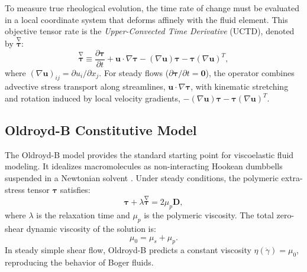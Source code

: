 To measure true rheological evolution, the time rate of change must be evaluated in a local coordinate system that deforms affinely with the fluid element.
This objective tensor rate is the \textit{Upper-Convected Time Derivative} (UCTD), denoted by $\overset{\nabla}{\boldsymbol{\tau}}$:
\begin{equation}
    \overset{\nabla}{\boldsymbol{\tau}} \equiv \frac{\partial \boldsymbol{\tau}}{\partial t} + \boldsymbol{u} \cdot \nabla \boldsymbol{\tau} - (\nabla \boldsymbol{u}) \boldsymbol{\tau} - \boldsymbol{\tau} (\nabla \boldsymbol{u})^T ,
    \label{eq:uctd_definition}
\end{equation}
where $(\nabla \boldsymbol{u})_{ij} = \partial u_i / \partial x_j$.
For steady flows ($\partial \boldsymbol{\tau}/\partial t = \boldsymbol{0}$),
the operator combines advective stress transport along streamlines, $\boldsymbol{u} \cdot \nabla \boldsymbol{\tau}$,
with kinematic stretching and rotation induced by local velocity gradients, $-(\nabla \boldsymbol{u})\boldsymbol{\tau} - \boldsymbol{\tau}(\nabla \boldsymbol{u})^T$.

\subsection{Oldroyd-B Constitutive Model}
\label{subsec:oldroyd_b}
The Oldroyd-B model \cite{oldroyd1950formulation} provides the standard starting point for viscoelastic fluid modeling.
It idealizes macromolecules as non-interacting Hookean dumbbells suspended in a Newtonian solvent \cite{bird1987dynamics}.
Under steady conditions, the polymeric extra-stress tensor $\boldsymbol{\tau}$ satisfies:
\begin{equation}
    \boldsymbol{\tau} + \lambda \overset{\nabla}{\boldsymbol{\tau}} = 2\mu_p \boldsymbol{D} ,
    \label{eq:oldroyd_b_dimensional}
\end{equation}
where $\lambda$ is the relaxation time and $\mu_p$ is the polymeric viscosity.
The total zero-shear dynamic viscosity of the solution is:
\begin{equation}
    \mu_0 = \mu_s + \mu_p .
    \label{eq:total_viscosity_zero_shear}
\end{equation}
In steady simple shear flow, Oldroyd-B predicts a constant viscosity $\eta(\dot{\gamma}) = \mu_0$, reproducing the behavior of Boger fluids.

